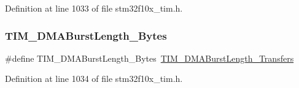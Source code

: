 Definition at line 1033 of file stm32f10x\+\_\+tim.\+h.

\mbox{\label{group___t_i_m___legacy_ga2868d400329e705b89c1e425c9cb4fed}} 
\subsubsection{\texorpdfstring{T\+I\+M\+\_\+\+D\+M\+A\+Burst\+Length\+\_\+Bytes}{TIM\_DMABurstLength\_9Bytes}}
{\footnotesize\ttfamily \#define T\+I\+M\+\_\+\+D\+M\+A\+Burst\+Length\+\_\+Bytes~\hyperlink{group___t_i_m___d_m_a___burst___length_ga98b208205c133557a9d67a0921559a66}{T\+I\+M\+\_\+\+D\+M\+A\+Burst\+Length\+\_\+Transfers}}



Definition at line 1034 of file stm32f10x\+\_\+tim.\+h.


